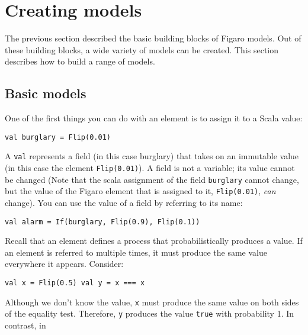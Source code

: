 
\chapter{Creating models} %

\label{Creating models} %

The previous section described the basic building blocks of Figaro models. Out of these building blocks, a wide variety of models can be created. This section describes how to build a range of models.

\section{Basic models}

One of the first things you can do with an element is to assign it to a Scala value:

\begin{flushleft}
\texttt{val burglary = Flip(0.01)}
\end{flushleft}


A \texttt{val} represents a field (in this case burglary) that takes on an immutable value (in this case the element \texttt{Flip(0.01)}). A field is not a variable; its value cannot be changed (Note that the scala assignment of the field \texttt{burglary} cannot change, but the value of the Figaro element that is assigned to it, \texttt{Flip(0.01)}, \emph{can} change). You can use the value of a field by referring to its name:

\begin{flushleft}
\texttt{val alarm = If(burglary, Flip(0.9), Flip(0.1))}
\end{flushleft}

Recall that an element defines a process that probabilistically produces a value. If an element is referred to multiple times, it must produce the same value everywhere it appears. Consider:

\begin{flushleft}
\texttt{val x = Flip(0.5)
\newline val y = x === x}
\end{flushleft}

Although we don't know the value, \texttt{x} must produce the same value on both sides of the equality test. Therefore, \texttt{y} produces the value \texttt{true} with probability 1. In contrast, in

